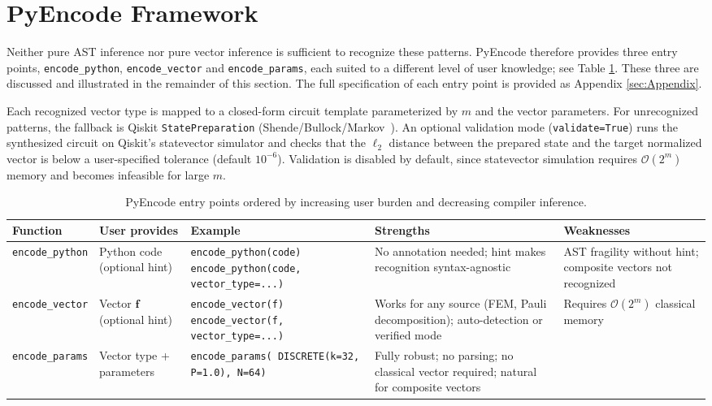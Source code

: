 \documentclass[10pt,twocolumn]{article}
\newcommand{\bigO}[1]{\mathcal{O}(#1)}
\begin{document}
\section{PyEncode Framework}

Neither pure AST inference nor pure vector inference is sufficient to recognize these patterns. PyEncode therefore provides three entry points, \texttt{encode\_python}, \texttt{encode\_vector} and \texttt{encode\_params}, each suited to a different level of user knowledge; see Table \ref{tab:encoding_strategies}. These three are discussed and illustrated in the remainder of this section. The full specification of each entry point is provided as Appendix \ref{sec:Appendix}.

Each recognized vector type is mapped to a closed-form circuit template parameterized by $m$ and the vector parameters. For unrecognized patterns, the fallback is Qiskit \texttt{StatePreparation} (Shende/Bullock/Markov~\cite{shende2006}). An optional validation mode (\texttt{validate=True}) runs the synthesized circuit on Qiskit's statevector simulator and checks that the $\ell_2$ distance between the prepared state and the target normalized vector is below a user-specified tolerance (default $10^{-6}$). Validation is disabled by default, since statevector simulation requires $\bigO{2^m}$ memory and becomes infeasible for large $m$.

\begin{table}[h!]
\centering
\small
\caption{PyEncode entry points ordered by increasing user burden and decreasing compiler inference.}
\label{tab:encoding_strategies}
\renewcommand{\arraystretch}{1.3}
\begin{tabular}{lp{1.8cm}p{3.8cm}p{3.8cm}p{3.0cm}}
\hline
\textbf{Function} & \textbf{User provides} & \textbf{Example} & \textbf{Strengths} & \textbf{Weaknesses} \\
\hline
\texttt{encode\_python} &
Python code (optional hint) &
\texttt{encode\_python(code)} \newline \texttt{encode\_python(code,} \texttt{vector\_type=...)} &
No annotation needed; hint makes recognition syntax-agnostic &
AST fragility without hint; composite vectors not recognized \\
\texttt{encode\_vector} &
Vector $\mathbf{f}$ (optional hint) &
\texttt{encode\_vector(f)} \newline \texttt{encode\_vector(f,} \texttt{vector\_type=...)} &
Works for any source (FEM, Pauli decomposition); auto-detection or verified mode &
Requires $\bigO{2^m}$ classical memory \\
\texttt{encode\_params} &
Vector type + parameters &
\texttt{encode\_params( DISCRETE(k=32, P=1.0), N=64)} &
Fully robust; no parsing; no classical vector required; natural for composite vectors \\
\hline
\end{tabular}
\end{table}
\end{document}
